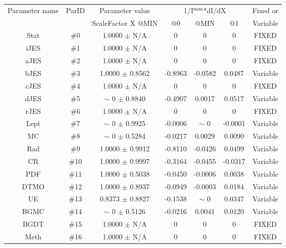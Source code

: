 \begin{table}[H]
\scriptsize
\begin{center}
\renewcommand{\arraystretch}{1.1}
\begin{tabular}{|c|c|c|ccc|c|}
\hline
Parameter name & ParID & Parameter value &\multicolumn{3}{|c|}{1/I$^\mathrm{nom}$*dI/dX} & Fixed or\\
 & & ScaleFactor X @MIN & @0 & @MIN & @1 & Variable\\
\hline
 {\tiny Stat} & \#0 &    1.0000 $\pm$ N/A & 0 & 0 & 0 & FIXED \\
 {\tiny iJES} & \#1 &    1.0000 $\pm$ N/A & 0 & 0 & 0 & FIXED \\
 {\tiny aJES} & \#2 &    1.0000 $\pm$ N/A & 0 & 0 & 0 & FIXED \\
 {\tiny bJES} & \#3 &    1.0000 $\pm$    0.8562 &   -0.8963 &   -0.0582 &    0.0487 & Variable \\
 {\tiny cJES} & \#4 &    1.0000 $\pm$ N/A & 0 & 0 & 0 & FIXED \\
 {\tiny dJES} & \#5 & {\tiny $\sim$ }0 $\pm$    0.8840 &   -0.4907 &    0.0017 &    0.0517 & Variable \\
 {\tiny rJES} & \#6 &    1.0000 $\pm$ N/A & 0 & 0 & 0 & FIXED \\
 {\tiny Lept} & \#7 & {\tiny $\sim$ }0 $\pm$    0.9925 &   -0.0006 & {\tiny $\sim$ }0 &   -0.0001 & Variable \\
 {\tiny MC} & \#8 & {\tiny $\sim$ }0 $\pm$    0.5284 &   -0.0217 &    0.0029 &    0.0090 & Variable \\
 {\tiny Rad} & \#9 &    1.0000 $\pm$    0.9912 &   -0.8110 &   -0.0426 &    0.0499 & Variable \\
 {\tiny CR} & \#10 &    1.0000 $\pm$    0.9997 &   -0.3164 &   -0.0455 &   -0.0317 & Variable \\
 {\tiny PDF} & \#11 &    1.0000 $\pm$    0.5038 &   -0.0450 &   -0.0006 &    0.0038 & Variable \\
 {\tiny DTMO} & \#12 &    1.0000 $\pm$    0.8937 &   -0.0949 &   -0.0003 &    0.0184 & Variable \\
 {\tiny UE} & \#13 &    0.8373 $\pm$    0.8827 &   -0.1538 & {\tiny $\sim$ }0 &    0.0347 & Variable \\
 {\tiny BGMC} & \#14 & {\tiny $\sim$ }0 $\pm$    0.5126 &   -0.0216 &    0.0041 &    0.0120 & Variable \\
 {\tiny BGDT} & \#15 &    1.0000 $\pm$ N/A & 0 & 0 & 0 & FIXED \\
 {\tiny Meth} & \#16 &    1.0000 $\pm$ N/A & 0 & 0 & 0 & FIXED \\

\end{tabular}
\end{center}
\end{table}
